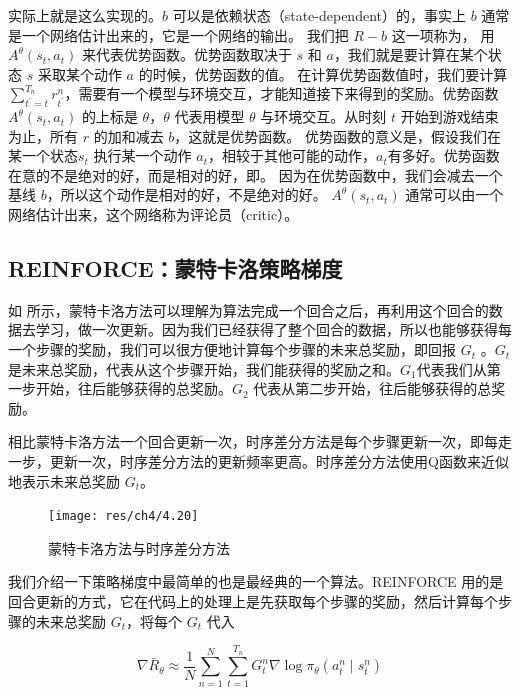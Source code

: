 实际上就是这么实现的。$b$ 可以是依赖状态（state-dependent）的，事实上 $b$ 通常是一个网络估计出来的，它是一个网络的输出。
我们把 $R-b$ 这一项称为， 用 $A^{\theta}(s_t,a_t)$ 来代表优势函数。优势函数取决于 $s$ 和 $a$，我们就是要计算在某个状态 $s$ 采取某个动作 $a$ 的时候，优势函数的值。
在计算优势函数值时，我们要计算 $\sum_{t^{\prime}=t}^{T_{n}} r_{t^{\prime}}^{n}$，需要有一个模型与环境交互，才能知道接下来得到的奖励。优势函数 $A^{\theta}\left(s_{t}, a_{t}\right)$ 的上标是 $\theta$，$\theta$ 代表用模型 $\theta$ 与环境交互。从时刻 $t$ 开始到游戏结束为止，所有 $r$ 的加和减去 $b$，这就是优势函数。
优势函数的意义是，假设我们在某一个状态$s_t$ 执行某一个动作 $a_t$，相较于其他可能的动作，$a_t$有多好。优势函数在意的不是绝对的好，而是相对的好，即。
因为在优势函数中，我们会减去一个基线 $b$，所以这个动作是相对的好，不是绝对的好。 $A^{\theta}\left(s_{t}, a_{t}\right)$ 通常可以由一个网络估计出来，这个网络称为评论员（critic）。 

\subsection{REINFORCE：蒙特卡洛策略梯度}

如 所示，蒙特卡洛方法可以理解为算法完成一个回合之后，再利用这个回合的数据去学习，做一次更新。因为我们已经获得了整个回合的数据，所以也能够获得每一个步骤的奖励，我们可以很方便地计算每个步骤的未来总奖励，即回报 $G_t$ 。$G_t$ 是未来总奖励，代表从这个步骤开始，我们能获得的奖励之和。$G_1 $代表我们从第一步开始，往后能够获得的总奖励。$G_2$ 代表从第二步开始，往后能够获得的总奖励。

相比蒙特卡洛方法一个回合更新一次，时序差分方法是每个步骤更新一次，即每走一步，更新一次，时序差分方法的更新频率更高。时序差分方法使用Q函数来近似地表示未来总奖励 $G_t$。
\begin{figure}[hbt]
    \centering
    \texttt{[image: res/ch4/4.20]}
    \caption{蒙特卡洛方法与时序差分方法}
    \label{fig:fig4.20}
\end{figure}

我们介绍一下策略梯度中最简单的也是最经典的一个算法。REINFORCE 用的是回合更新的方式，它在代码上的处理上是先获取每个步骤的奖励，然后计算每个步骤的未来总奖励 $G_t$，将每个 $G_t$ 代入

\begin{equation}
    \label{eq:reinforce_update}
    \nabla \bar{R}_{\theta} \approx \frac{1}{N} \sum_{n=1}^{N} \sum_{t=1}^{T_{n}} G_{t}^{n} \nabla \log \pi_{\theta}\left(a_{t}^{n} \mid s_{t}^{n}\right)
\end{equation}

